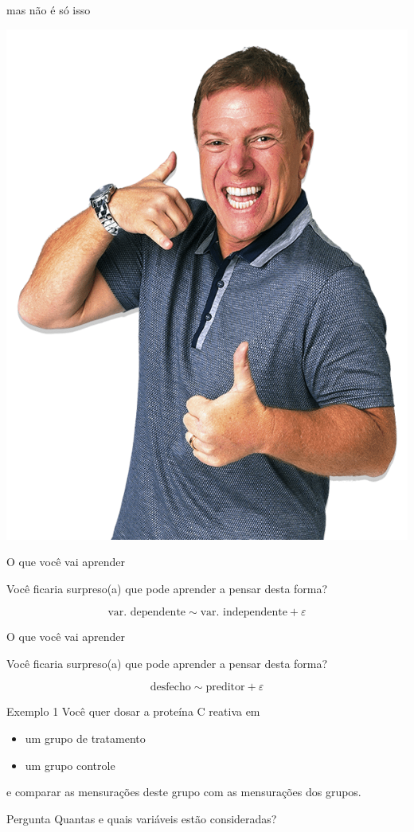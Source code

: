 \documentclass{beamer}
\begin{document}
\begin{frame}{\scriptsize mas não é só isso}
  \begin{center}
    \includegraphics[width=.7\textwidth]{Cap1/bottini}
  \end{center}
\end{frame}

\begin{frame}{\scriptsize O que você vai aprender}
  \begin{block}{}
    \footnotesize
    Você ficaria surpreso(a) que pode aprender a pensar desta forma?
  \end{block}

  $$\text{var. dependente} \sim \text{var. independente} + \varepsilon$$
\end{frame}

\begin{frame}{\scriptsize O que você vai aprender}
  \begin{block}{}
    \footnotesize
    Você ficaria surpreso(a) que pode aprender a pensar desta forma?
  \end{block}

  $$\text{desfecho} \sim \text{preditor} + \varepsilon$$
\end{frame}

\begin{frame}{\scriptsize }
  \begin{exampleblock}{Exemplo 1}
    \footnotesize
    Você quer dosar a proteína C reativa em
    \begin{itemize}
    \footnotesize
    \item um grupo de tratamento
    \item um grupo controle
    \end{itemize}
    e comparar as mensurações deste grupo com as mensurações dos grupos.
  \end{exampleblock}
  \begin{block}{Pergunta}
    \footnotesize
    Quantas e quais variáveis estão consideradas?
  \end{block}
\end{frame}
\end{document}
